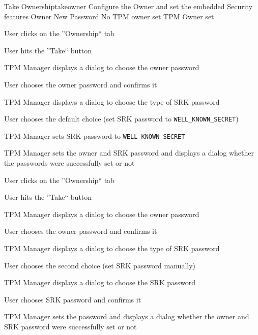 \documentclass[
  american        %
]{sirrixreport}
\begin{document}
\begin{usecase}{Take Ownership}{takeowner}
\ucdesc Configure the Owner and set the embedded Security features
\ucactors Owner
\ucinclude New Password
\ucprecond No TPM owner set
\ucpostcond TPM Owner set
\ucnormal 
 \item User clicks on the ''Ownership`` tab
 \item User hits the ''Take`` button
 \item TPM Manager displays a dialog to choose the owner password
 \item User chooses the owner password and confirms it
 \item TPM Manager displays a dialog to choose the type of SRK password
 \item User chooses the default choice (set SRK password to \lstinline'WELL_KNOWN_SECRET')
 \item TPM Manager sets SRK password to \lstinline'WELL_KNOWN_SECRET'
 \item TPM Manager sets the owner and SRK password and displays a dialog whether the passwords were successfully set or not
\ucendflow 
\ucalternate
 \item User clicks on the ''Ownership`` tab
 \item User hits the ''Take`` button
 \item TPM Manager displays a dialog to choose the owner password
 \item User chooses the owner password and confirms it
 \item TPM Manager displays a dialog to choose the type of SRK password
 \item User chooses the second choice (set SRK password manually)
 \item TPM Manager displays a dialog to choose the SRK password
 \item User chooses SRK password and confirms it
 \item TPM Manager sets the password and displays a dialog whether the owner and SRK password were successfully set or not
\ucendflow 
\end{usecase}
\clearpage
\end{document}
